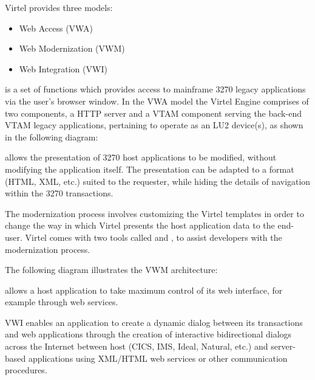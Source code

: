 \documentclass[letterpaper,10pt,english]{sphinxmanual}
\begin{document}
Virtel provides three models:
\begin{itemize}
\item {} 
Web Access (VWA)

\item {} 
Web Modernization (VWM)

\item {} 
Web Integration (VWI)

\end{itemize}

\newpage

 is a set of functions which provides access to mainframe 3270 legacy applications via the user’s browser window. In the VWA model the Virtel Engine comprises of two components, a HTTP server and a VTAM component serving the back-end VTAM legacy applications, pertaining to operate as an LU2 device(s), as shown in the following diagram:


\newpage

 allows the presentation of 3270 host applications to be modified, without modifying the application itself. The presentation can be adapted to a format (HTML, XML, etc.) suited to the requester, while hiding the details of navigation within the 3270 transactions.

The modernization process involves customizing the Virtel templates in order to change the way in which Virtel presents the host application data to the end-user. Virtel comes with two tools called  and , to assist developers with the modernization process.

The following diagram illustrates the VWM architecture:


\newpage

 allows a host application to take maximum control of its web interface, for example through web services.

VWI enables an application to create a dynamic dialog between its transactions and web applications through the creation of interactive bidirectional dialogs across the Internet between host (CICS, IMS, Ideal, Natural, etc.) and server-based applications using XML/HTML web services or other communication procedures.
\end{document}
